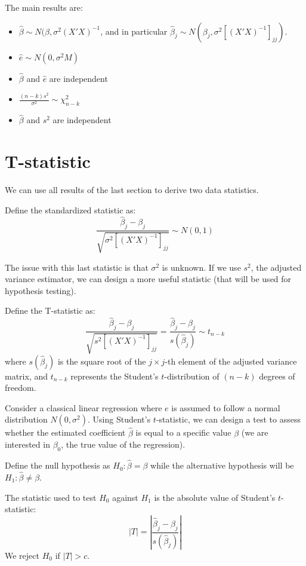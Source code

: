 The main results are:\begin{itemize}
\item $\hat{\beta} \sim N(\beta,\sigma^2(X'X)^{-1}$, and in particular $\hat{\beta}_j \sim N(\beta_j,\sigma^2\left[(X'X)^{-1}\right]_{jj})$.
\item $\hat e \sim N(0, \sigma^2M)$
\item $\hat\beta$ and $\hat e$ are independent
\item $\frac{(n-k)s^2}{\sigma^2}\sim \chi_{n-k}^2$
\item $\hat\beta$ and $s^2$ are independent
\end{itemize}

\section{T-statistic}

We can use all results of the last section to derive two data statistics.

\begin{definition}
Define the standardized statistic as:$$\frac{\hat{\beta}_j - \beta_j}{\sqrt{\sigma^2\left[(X'X)^{-1}\right]_{jj}}} \sim N(0,1) $$
\end{definition}

The issue with this last statistic is that $\sigma^2$ is unknown. If we use $s^2$, the adjusted variance estimator, we can design a more useful statistic (that will be used for hypothesis testing).

\begin{definition}[T-statistic]
Define the T-statistic as: $$ \frac{\hat{\beta}_j - \beta_j}{\sqrt{s^2\left[(X'X)^{-1}\right]_{jj}}} = \frac{\hat{\beta}_j - \beta_j}{s(\hat\beta_j)} \sim t_{n-k} $$ where $s(\hat\beta_j)$ is the square root of the $j\times j$-th element of the adjusted variance matrix, and $t_{n-k}$ represents the Student's $t$-distribution of $(n-k)$ degrees of freedom.
\end{definition}

Consider a classical linear regression where $e$ is assumed to follow a normal distribution $N(0,\sigma^2)$. Using Student's $t$-statistic, we can design a test to assess whether the estimated coefficient $\hat\beta$ is equal to a specific value $\beta$ (we are interested in $\beta_0$, the true value of the regression).

\begin{proposition}
Define the null hypothesis as $H_0 : \hat\beta = \beta$ while the alternative hypothesis will be $H_1:\hat\beta \neq \beta$.

The statistic used to test $H_0$ against $H_1$ is the absolute value of Student's $t$-statistic: $$\vert T\vert = \left\vert \frac{\hat{\beta}_j - \beta_j}{s(\hat\beta_j)} \right\vert $$ We reject $H_0$ if $\vert T\vert > c$. 
\end{proposition}

